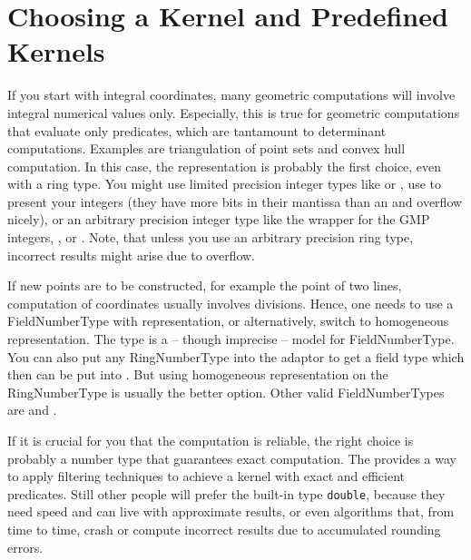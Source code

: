 \section{Choosing a Kernel and Predefined Kernels}
If you start with integral  coordinates,
many geometric computations will involve integral numerical values
only. Especially, this is true for geometric computations that
evaluate only predicates, which are tantamount to determinant
computations. Examples are triangulation of point sets and convex hull
computation.  In this case, the 
representation is probably the first choice, even with a ring type.
You might use limited precision integer types like  or
, use  to present your integers (they have more
bits in their mantissa than an  and overflow nicely), or an
arbitrary precision integer type like the wrapper  for the
GMP integers, , or . Note, that unless
you use an arbitrary precision ring type, incorrect results might
arise due to overflow.

If new points are to be constructed, for example the
 point of two lines, computation of
 coordinates usually involves divisions.
Hence, one needs to use a FieldNumberType with
 representation, or alternatively, switch
to homogeneous representation. The type  is a -- though
imprecise -- model for FieldNumberType. You can also put any
RingNumberType into the  adaptor to get a field type
which then can be put into . But using homogeneous
representation on the RingNumberType is usually the better option.
Other valid FieldNumberTypes are  and
.

If it is crucial for you that the computation is reliable, the right
choice is probably a number type that guarantees exact computation.
The  provides a way to apply filtering techniques
\cite{cgal:bbp-iayed-01} to achieve a kernel with exact and efficient
predicates. %
Still other people will prefer the built-in
type {\tt double}, because they need speed and can live with
approximate results, or even algorithms that, from time to time,
crash or compute incorrect results due to accumulated rounding errors.

